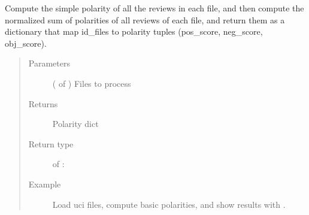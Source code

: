 \documentclass[letterpaper,10pt,english]{sphinxmanual}
\begin{document}
\begin{fulllineitems}
\label{\detokenize{analysis:loacore.analysis.sentiment_analysis.compute_simple_files_polarity}}
Compute the simple polarity of all the reviews in each file, and then compute the normalized sum of polarities of
all reviews of each file, and return them as a dictionary that map id\_files to polarity tuples (pos\_score,
neg\_score, obj\_score).
\begin{quote}\begin{description}
\item[{Parameters}] \leavevmode
{} ( of ) \textendash{} Files to process

\item[{Returns}] \leavevmode
Polarity dict

\item[{Return type}] \leavevmode
{} of  : 

\item[{Example}] \leavevmode
Load uci files, compute basic polarities, and show results with .


\end{description}
\end{quote}
\end{fulllineitems}
\end{document}
